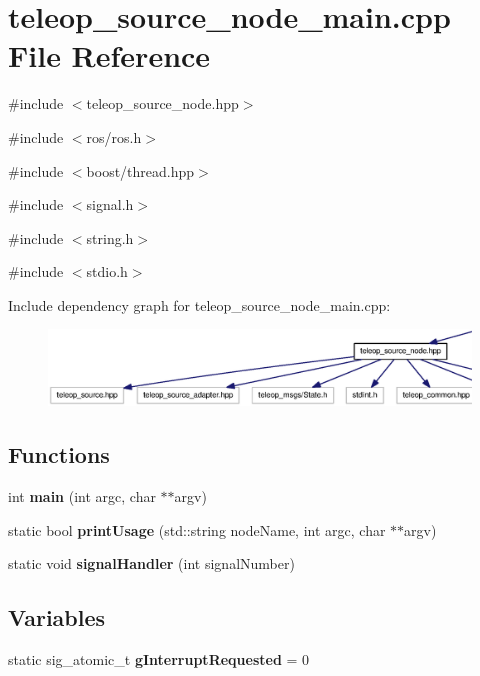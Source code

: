 \section{teleop\_\-source\_\-node\_\-main.cpp File Reference}
\label{teleop__source__node__main_8cpp}
{\ttfamily \#include $<$teleop\_\-source\_\-node.hpp$>$}\par
{\ttfamily \#include $<$ros/ros.h$>$}\par
{\ttfamily \#include $<$boost/thread.hpp$>$}\par
{\ttfamily \#include $<$signal.h$>$}\par
{\ttfamily \#include $<$string.h$>$}\par
{\ttfamily \#include $<$stdio.h$>$}\par
Include dependency graph for teleop\_\-source\_\-node\_\-main.cpp:
\nopagebreak
\begin{figure}[H]
\begin{center}
\leavevmode
\includegraphics[width=400pt]{teleop__source__node__main_8cpp__incl}
\end{center}
\end{figure}
\subsection*{Functions}
\begin{DoxyCompactItemize}
\item 
int {\bf main} (int argc, char $\ast$$\ast$argv)
\item 
static bool {\bf printUsage} (std::string nodeName, int argc, char $\ast$$\ast$argv)
\item 
static void {\bf signalHandler} (int signalNumber)
\end{DoxyCompactItemize}
\subsection*{Variables}
\begin{DoxyCompactItemize}
\item 
static sig\_\-atomic\_\-t {\bf gInterruptRequested} = 0
\end{DoxyCompactItemize}


